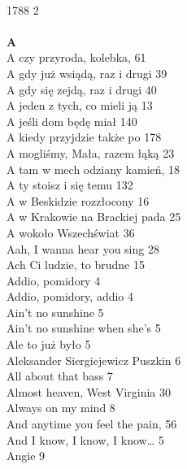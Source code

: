 \documentclass[a5paper, 10pt]{book}
\begin{document}


\newpage
{\scriptsize
  \begin{multicols}{3}
    ~\\
    1788 2\\
    \\
    {\footnotesize \textbf{A\\} }
    A czy przyroda, kolebka, 61\\
    A gdy już wsiądą, raz i drugi 39\\
    A gdy się zejdą, raz i drugi 40\\
    A jeden z tych, co mieli ją 13\\
    A jeśli dom będę miał 140\\
    A kiedy przyjdzie także po 178\\
    A mogliśmy, Mała, razem łąką 23\\
    A tam w mech odziany kamień, 18\\
    A ty stoisz i się temu 132\\
    A w Beskidzie rozzłocony 16\\
    A w Krakowie na Brackiej pada 25\\
    A wokoło Wszechświat 36\\
    Aah, I wanna hear you sing 28\\
    Ach Ci ludzie, to brudne 15\\
    Addio, pomidory 4\\
    Addio, pomidory, addio 4\\
    Ain't no sunshine 5\\
    Ain't no sunshine when she's 5\\
    Ale to już było 5\\
    Aleksander Siergiejewicz Puszkin 6\\
    All about that bass 7\\
    Almost heaven, West Virginia 30\\
    Always on my mind 8\\
    And anytime you feel the pain, 56\\
    And I know, I know, I know… 5\\
    Angie 9\\

\end{multicols}}
\end{document}
